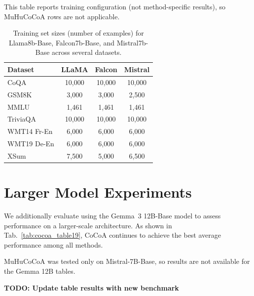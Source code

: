 \documentclass[11pt]{article}
\newcommand{\method}{MuHuCoCoA}
\newcommand{\tabref}[1]{Tab.~\ref{#1}}
\begin{document}
This table reports training configuration (not method-specific results), so \method{} rows are not applicable.

\begin{table}[htbp]
\centering
\begin{tabular}{l ccc}
\toprule
Dataset & LLaMA & Falcon & Mistral \\
\midrule
CoQA & 10{,}000 & 10{,}000 & 10{,}000 \\
GSM8K & 3{,}000 & 3{,}000 & 2{,}500 \\
MMLU & 1{,}461 & 1{,}461 & 1{,}461 \\
TriviaQA & 10{,}000 & 10{,}000 & 10{,}000 \\
WMT14 Fr-En & 6{,}000 & 6{,}000 & 6{,}000 \\
WMT19 De-En & 6{,}000 & 6{,}000 & 6{,}000 \\
XSum & 7{,}500 & 5{,}000 & 6{,}500 \\
\bottomrule
\end{tabular}
\caption{Training set sizes (number of examples) for Llama8b-Base, Falcon7b-Base, and Mistral7b-Base across several datasets.}
\label{tab:cocoa_table18}
\end{table}
\section{Larger Model Experiments}
\label{app:larger_model}

We additionally evaluate using the Gemma~3 12B-Base model to assess performance on a larger-scale architecture. As shown in \tabref{tab:cocoa_table19}, CoCoA continues to achieve the best average performance among all methods.

\method{} was tested only on Mistral-7B-Base, so results are not available for the Gemma 12B tables.

\textbf{TODO: Update table results with new benchmark}
\end{document}
